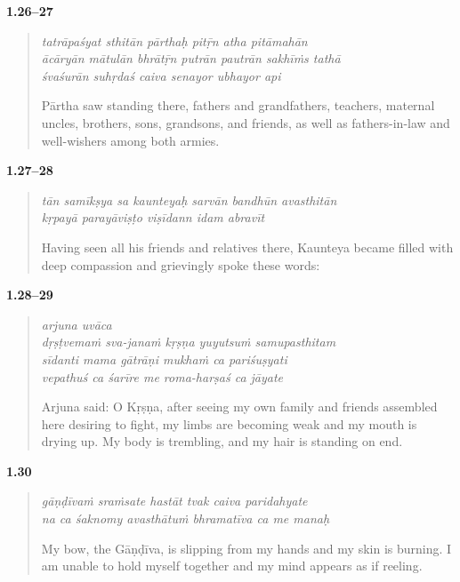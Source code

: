 \par\noindent\textbf{1.26–27}\par
\begin{verse}
\textit{tatrāpaśyat sthitān pārthaḥ pitṝn atha pitāmahān} \\
\textit{ācāryān mātulān bhrātṝn putrān pautrān sakhīṁs tathā} \\
\textit{śvaśurān suhṛdaś caiva senayor ubhayor api}

\noindent Pārtha saw standing there, fathers and grandfathers, teachers, maternal uncles, brothers, sons, grandsons, and friends, as well as fathers-in-law and well-wishers among both armies.
\end{verse}
\par



\par\noindent\textbf{1.27–28}\par
\begin{verse}
\textit{tān samīkṣya sa kaunteyaḥ sarvān bandhūn avasthitān} \\
\textit{kṛpayā parayāviṣṭo viṣīdann idam abravīt}

\noindent Having seen all his friends and relatives there, Kaunteya became filled with deep compassion and grievingly spoke these words:
\end{verse}
\par



\par\noindent\textbf{1.28–29}\par
\begin{verse}
\textit{arjuna uvāca} \\
\textit{dṛṣṭvemaṁ sva-janaṁ kṛṣṇa yuyutsuṁ samupasthitam} \\
\textit{sīdanti mama gātrāṇi mukhaṁ ca pariśuṣyati} \\
\textit{vepathuś ca śarīre me roma-harṣaś ca jāyate}

\noindent Arjuna said: O Kṛṣṇa, after seeing my own family and friends assembled here desiring to fight, my limbs are becoming weak and my mouth is drying up. My body is trembling, and my hair is standing on end.
\end{verse}
\par



\par\noindent\textbf{1.30}\par
\begin{verse}
\textit{gāṇḍīvaṁ sraṁsate hastāt tvak caiva paridahyate} \\
\textit{na ca śaknomy avasthātuṁ bhramatīva ca me manaḥ}

\noindent My bow, the Gāṇḍīva, is slipping from my hands and my skin is burning. I am unable to hold myself together and my mind appears as if reeling.
\end{verse}
\par



